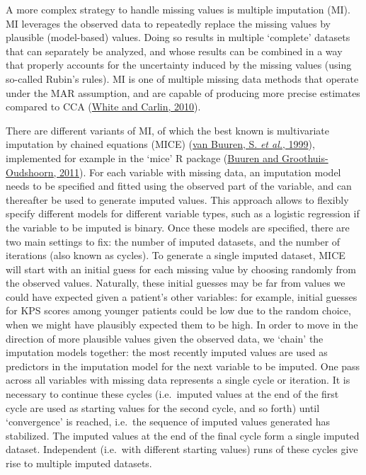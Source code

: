 \documentclass[
  letterpaper,
  DIV=11,
  numbers=noendperiod]{scrreprt}
\begin{document}
A more complex strategy to handle missing values is multiple imputation
(MI). MI leverages the observed data to repeatedly replace the missing
values by plausible (model-based) values. Doing so results in multiple
`complete' datasets that can separately be analyzed, and whose results
can be combined in a way that properly accounts for the uncertainty
induced by the missing values (using so-called Rubin's rules). MI is one
of multiple missing data methods that operate under the MAR assumption,
and are capable of producing more precise estimates compared to CCA
(\protect\hyperlink{ref-whiteBiasEfficiencyMultiple2010}{White and
Carlin, 2010}).

There are different variants of MI, of which the best known is
multivariate imputation by chained equations (MICE)
(\protect\hyperlink{ref-vanbuurens.FlexibleMultivariateImputation1999}{van
Buuren, S. \emph{et al.}, 1999}), implemented for example in the `mice'
R package
(\protect\hyperlink{ref-buurenMiceMultivariateImputation2011}{Buuren and
Groothuis-Oudshoorn, 2011}). For each variable with missing data, an
imputation model needs to be specified and fitted using the observed
part of the variable, and can thereafter be used to generate imputed
values. This approach allows to flexibly specify different models for
different variable types, such as a logistic regression if the variable
to be imputed is binary. Once these models are specified, there are two
main settings to fix: the number of imputed datasets, and the number of
iterations (also known as cycles). To generate a single imputed dataset,
MICE will start with an initial guess for each missing value by choosing
randomly from the observed values. Naturally, these initial guesses may
be far from values we could have expected given a patient's other
variables: for example, initial guesses for KPS scores among younger
patients could be low due to the random choice, when we might have
plausibly expected them to be high. In order to move in the direction of
more plausible values given the observed data, we `chain' the imputation
models together: the most recently imputed values are used as predictors
in the imputation model for the next variable to be imputed. One pass
across all variables with missing data represents a single cycle or
iteration. It is necessary to continue these cycles (i.e.~imputed values
at the end of the first cycle are used as starting values for the second
cycle, and so forth) until `convergence' is reached, i.e.~the sequence
of imputed values generated has stabilized. The imputed values at the
end of the final cycle form a single imputed dataset. Independent
(i.e.~with different starting values) runs of these cycles give rise to
multiple imputed datasets.
\end{document}
